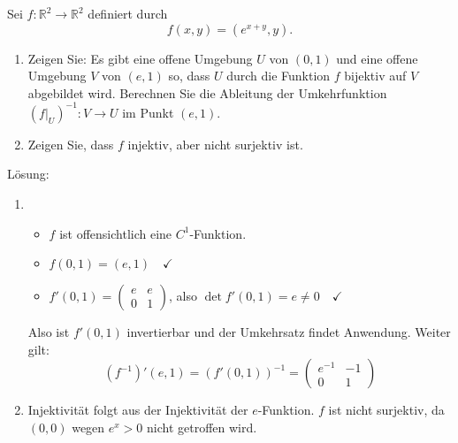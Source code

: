 Sei $f : \mathbb{R}^2 \to \mathbb{R}^2$ definiert durch
\begin{displaymath}
  f(x,y) = (e^{x + y}, y).
\end{displaymath}
\begin{enumerate}
    \item Zeigen Sie:
    Es gibt eine offene Umgebung $U$ von $(0,1)$ und eine offene Umgebung $V$ von $(e,1)$ so, dass $U$ durch die Funktion $f$ bijektiv auf $V$ abgebildet wird.
    Berechnen Sie die Ableitung der Umkehrfunktion $(f|_U)^{-1} : V \to U$ im Punkt $(e,1)$.
    \item Zeigen Sie, dass $f$ injektiv, aber nicht surjektiv ist.
\end{enumerate}
Lösung: 
\begin{enumerate}
    \item
    \begin{itemize}
        \item $f$ ist offensichtlich eine $C^1$-Funktion.
        \item $f(0,1) = (e,1) \quad \checkmark$
        \item $f'(0,1) = \begin{pmatrix} e & e\\ 0 & 1\end{pmatrix}$, also $\det f'(0,1) = e \neq 0 \quad \checkmark$
    \end{itemize}
    Also ist $f'(0,1)$ invertierbar und der Umkehrsatz findet Anwendung.
    Weiter gilt:
    \begin{displaymath}
      (f^{-1})'(e, 1) = (f'(0,1))^{-1} =
      \begin{pmatrix}
        e^{-1} & -1\\
        0 & 1
     \end{pmatrix}
    \end{displaymath}
    \item Injektivität folgt aus der Injektivität der $e$-Funktion.
    $f$ ist nicht surjektiv, da $(0,0)$ wegen $e^x > 0$ nicht getroffen wird.
\end{enumerate}


